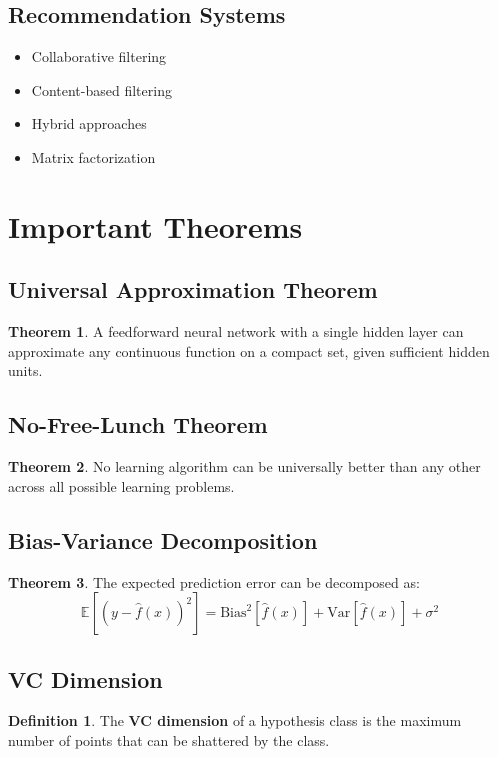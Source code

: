 \documentclass[11pt]{article}
\theoremstyle{definition}
\newtheorem{definition}{Definition}[section]
\newtheorem{theorem}{Theorem}[section]
\begin{document}
\subsection{Recommendation Systems}
\begin{itemize}
    \item Collaborative filtering
    \item Content-based filtering
    \item Hybrid approaches
    \item Matrix factorization
\end{itemize}

\section{Important Theorems}

\subsection{Universal Approximation Theorem}
\begin{theorem}
A feedforward neural network with a single hidden layer can approximate any continuous function on a compact set, given sufficient hidden units.
\end{theorem}

\subsection{No-Free-Lunch Theorem}
\begin{theorem}
No learning algorithm can be universally better than any other across all possible learning problems.
\end{theorem}

\subsection{Bias-Variance Decomposition}
\begin{theorem}
The expected prediction error can be decomposed as:
$$\mathbb{E}[(y - \hat{f}(x))^2] = \text{Bias}^2[\hat{f}(x)] + \text{Var}[\hat{f}(x)] + \sigma^2$$
\end{theorem}

\subsection{VC Dimension}
\begin{definition}
The \textbf{VC dimension} of a hypothesis class is the maximum number of points that can be shattered by the class.
\end{definition}
\end{document}
